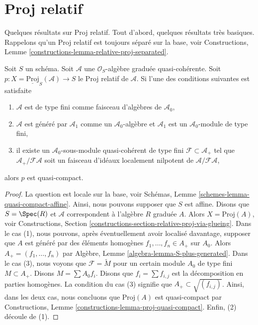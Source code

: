 \section{Proj relatif}
\label{section-relative-proj}

\noindent
Quelques résultats sur Proj relatif. Tout d'abord, quelques résultats très
basiques. Rappelons qu'un Proj relatif est toujours séparé sur la base, voir
Constructions, Lemme  \ref{constructions-lemma-relative-proj-separated}.

\begin{lemma}
\label{lemma-relative-proj-quasi-compact}
Soit  $S$  un schéma. Soit  $\mathcal{A}$  une  $\mathcal{O}_S$-algèbre graduée
quasi-cohérente. Soit  $p : X = \underline{\text{Proj}}_S(\mathcal{A}) \to S$  le Proj relatif de  $\mathcal{A}$. Si l'une des
conditions suivantes est satisfaite
\begin{enumerate}
\item $\mathcal{A}$  est de type fini comme faisceau d'algèbres de  $\mathcal{A}_0$,
\item $\mathcal{A}$  est généré par  $\mathcal{A}_1$  comme un  $\mathcal{A}_0$-algèbre et
 $\mathcal{A}_1$  est un  $\mathcal{A}_0$-module de type fini,
\item il existe un  $\mathcal{A}_0$-sous-module quasi-cohérent de type fini  $\mathcal{F} \subset \mathcal{A}_{+}$  tel
que  $\mathcal{A}_{+}/\mathcal{F}\mathcal{A}$  soit un faisceau d'idéaux localement nilpotent de  $\mathcal{A}/\mathcal{F}\mathcal{A}$,
\end{enumerate}
alors  $p$  est quasi-compact.
\end{lemma}

\begin{proof}
La question est locale sur la base, voir Schémas, Lemme  \ref{schemes-lemma-quasi-compact-affine}. Ainsi, nous
pouvons supposer que  $S$  est affine. Disons que  $S = \Spec(R)$  et
 $\mathcal{A}$  correspondent à l'algèbre  $R$ graduée  $A$. Alors
 $X = \text{Proj}(A)$, voir Constructions, Section  \ref{constructions-section-relative-proj-via-glueing}. Dans le cas (1), nous
pouvons, après éventuellement avoir localisé davantage, supposer que  $A$ 
est généré par des éléments homogènes  $f_1, \ldots, f_n \in A_{+}$  sur  $A_0$. Alors
 $A_{+} = (f_1, \ldots, f_n)$  par Algèbre, Lemme  \ref{algebra-lemma-S-plus-generated}. Dans le cas (3), nous voyons que
 $\mathcal{F} = \widetilde{M}$  pour un certain module  $A_0$ de type fini  $M \subset A_{+}$. Disons
 $M = \sum A_0f_i$. Disons que  $f_i = \sum f_{i, j}$  est la décomposition en parties homogènes.
La condition du cas (3) signifie que  $A_{+} \subset \sqrt{(f_{i, j})}$. Ainsi, dans les deux cas, nous
concluons que  $\text{Proj}(A)$  est quasi-compact par Constructions, Lemme
 \ref{constructions-lemma-proj-quasi-compact}. Enfin, (2) découle de (1).
\end{proof}

